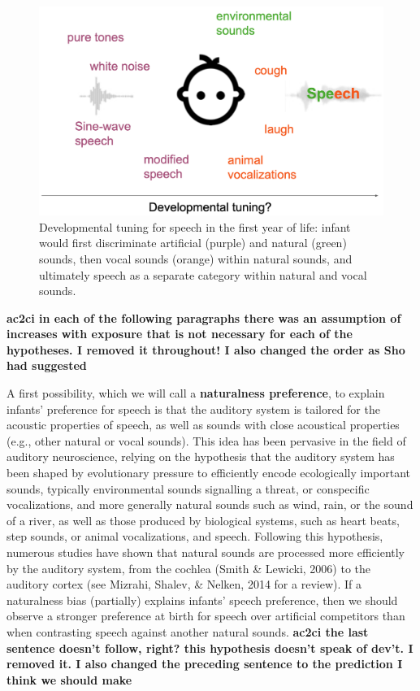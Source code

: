 \documentclass[
  english,
  man]{apa6}
\begin{document}
\begin{figure}
\includegraphics[width=5.31in]{figures_intro/tuning} \caption{Developmental tuning for speech in the first year of life: infant would first discriminate artificial (purple) and natural (green) sounds, then vocal sounds (orange) within natural sounds, and ultimately speech as a separate category within natural and vocal sounds.}\label{fig:venn}
\end{figure}

\textbf{ac2ci in each of the following paragraphs there was an assumption of increases with exposure that is not necessary for each of the hypotheses. I removed it throughout! I also changed the order as Sho had suggested}

A first possibility, which we will call a \textbf{naturalness preference}, to explain infants' preference for speech is that the auditory system is tailored for the acoustic properties of speech, as well as sounds with close acoustical properties (e.g., other natural or vocal sounds). This idea has been pervasive in the field of auditory neuroscience, relying on the hypothesis that the auditory system has been shaped by evolutionary pressure to efficiently encode ecologically important sounds, typically environmental sounds signalling a threat, or conspecific vocalizations, and more generally natural sounds such as wind, rain, or the sound of a river, as well as those produced by biological systems, such as heart beats, step sounds, or animal vocalizations, and speech. Following this hypothesis, numerous studies have shown that natural sounds are processed more efficiently by the auditory system, from the cochlea (Smith \& Lewicki, 2006) to the auditory cortex (see Mizrahi, Shalev, \& Nelken, 2014 for a review). If a naturalness bias (partially) explains infants' speech preference, then we should observe a stronger preference at birth for speech over artificial competitors than when contrasting speech against another natural sounds.
\textbf{ac2ci the last sentence doesn't follow, right? this hypothesis doesn't speak of dev't. I removed it. I also changed the preceding sentence to the prediction I think we should make}
\end{document}
